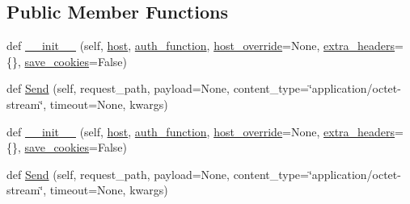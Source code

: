 \subsection*{Public Member Functions}
\begin{DoxyCompactItemize}
\item 
def \hyperlink{classupload_1_1AbstractRpcServer_a3f6bc1bd16b52bd5a5c33a1fedeef2d0}{\+\_\+\+\_\+init\+\_\+\+\_\+} (self, \hyperlink{classupload_1_1AbstractRpcServer_ab7188d827e2faddcf970f524f5856192}{host}, \hyperlink{classupload_1_1AbstractRpcServer_aee0090a3bcf07b913a7dd596a5dabb8f}{auth\+\_\+function}, \hyperlink{classupload_1_1AbstractRpcServer_a783a4a7e4ffb776a57a3f267300a213b}{host\+\_\+override}=None, \hyperlink{classupload_1_1AbstractRpcServer_adbbf0109afc13d58d7815fa143cb779f}{extra\+\_\+headers}=\{\}, \hyperlink{classupload_1_1AbstractRpcServer_affe342205c4647d41b127f5a5634858b}{save\+\_\+cookies}=False)
\item 
def \hyperlink{classupload_1_1AbstractRpcServer_ac1b913f8bd00da4741c47ab49ea94cb5}{Send} (self, request\+\_\+path, payload=None, content\+\_\+type=\char`\"{}application/octet-\/stream\char`\"{}, timeout=None, kwargs)
\item 
def \hyperlink{classupload_1_1AbstractRpcServer_a3f6bc1bd16b52bd5a5c33a1fedeef2d0}{\+\_\+\+\_\+init\+\_\+\+\_\+} (self, \hyperlink{classupload_1_1AbstractRpcServer_ab7188d827e2faddcf970f524f5856192}{host}, \hyperlink{classupload_1_1AbstractRpcServer_aee0090a3bcf07b913a7dd596a5dabb8f}{auth\+\_\+function}, \hyperlink{classupload_1_1AbstractRpcServer_a783a4a7e4ffb776a57a3f267300a213b}{host\+\_\+override}=None, \hyperlink{classupload_1_1AbstractRpcServer_adbbf0109afc13d58d7815fa143cb779f}{extra\+\_\+headers}=\{\}, \hyperlink{classupload_1_1AbstractRpcServer_affe342205c4647d41b127f5a5634858b}{save\+\_\+cookies}=False)
\item 
def \hyperlink{classupload_1_1AbstractRpcServer_ac1b913f8bd00da4741c47ab49ea94cb5}{Send} (self, request\+\_\+path, payload=None, content\+\_\+type=\char`\"{}application/octet-\/stream\char`\"{}, timeout=None, kwargs)
\end{DoxyCompactItemize}
